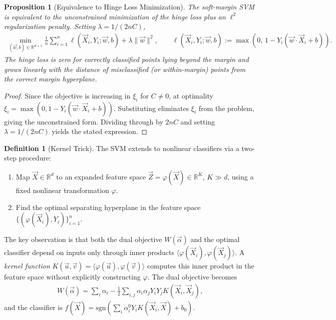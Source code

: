 \documentclass[11pt]{article}
\theoremstyle{definition}
\newtheorem{definition}{Definition}[section]
\theoremstyle{plain}
\newtheorem{proposition}{Proposition}[section]
\theoremstyle{remark}
\begin{document}
\begin{proposition}[Equivalence to Hinge Loss Minimization]
    The soft-margin SVM is equivalent to the unconstrained minimization of the \emph{hinge loss} plus an $\ell^2$ regularization penalty. Setting $\lambda = 1/(2nC)$,
    \begin{align}
        \min_{(\vec{w},b) \in \mathbb{R}^{d+1}} \frac{1}{n}\sum_{i=1}^n \ell(\vec{X}_i, Y_i;\vec{w},b) + \lambda\|\vec{w}\|^2, \qquad \ell(\vec{X}_i,Y_i;\vec{w},b) := \max\!\left(0,\, 1 - Y_i(\vec{w}\cdot\vec{X}_i + b)\right).
    \end{align}
    The hinge loss is zero for correctly classified points lying beyond the margin and grows linearly with the distance of misclassified (or within-margin) points from the correct margin hyperplane.
\end{proposition}
\begin{proof}
    Since the objective is increasing in $\xi_i$ for $C \neq 0$, at optimality $\xi_i = \max(0, 1 - Y_i(\vec{w}\cdot\vec{X}_i+b))$. Substituting eliminates $\xi_i$ from the problem, giving the unconstrained form. Dividing through by $2nC$ and setting $\lambda = 1/(2nC)$ yields the stated expression.
\end{proof}


\begin{definition}[Kernel Trick]
    The SVM extends to nonlinear classifiers via a two-step procedure:
    \begin{enumerate}[noitemsep]
        \item Map $\vec{X} \in \mathbb{R}^d$ to an expanded feature space $\vec{Z} = \varphi(\vec{X}) \in \mathbb{R}^K$, $K \gg d$, using a fixed nonlinear transformation $\varphi$.
        \item Find the optimal separating hyperplane in the feature space $\{(\varphi(\vec{X}_i), Y_i)\}_{i=1}^n$.
    \end{enumerate}
    The key observation is that both the dual objective $W(\vec{\alpha})$ and the optimal classifier depend on inputs only through inner products $\langle\varphi(\vec{X}_i),\varphi(\vec{X}_j)\rangle$. A \emph{kernel function} $K(\vec{u},\vec{v}) = \langle\varphi(\vec{u}),\varphi(\vec{v})\rangle$ computes this inner product in the feature space without explicitly constructing $\varphi$. The dual objective becomes
    \begin{align}
        W(\vec{\alpha}) = \sum_i \alpha_i - \frac{1}{2}\sum_{i,j} \alpha_i\alpha_j Y_i Y_j K(\vec{X}_i,\vec{X}_j),
    \end{align}
    and the classifier is $f(\vec{X}) = \mathrm{sgn}\!\left(\sum_i \alpha_i^0 Y_i K(\vec{X}_i, \vec{X}) + b_0\right)$.
\end{definition}
\end{document}
